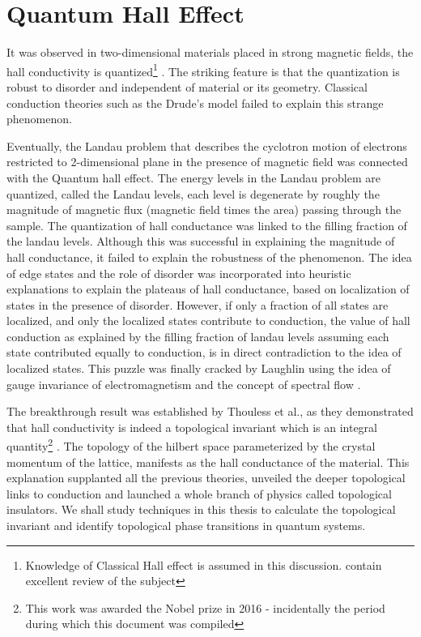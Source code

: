 %

\chapter{Quantum Hall Effect}\label{ch:qhe}
It was observed in two-dimensional materials placed in strong magnetic fields, the hall conductivity is quantized\footnote{Knowledge of Classical Hall effect is assumed in this discussion.
\parencite{kitel1971introduction,tong2016lectures,jain2007composite} contain excellent review of the subject} \cite{klitzing1980new, prange1990quantum, jain2007composite}. The striking feature is that the quantization is robust to disorder and independent of
material or its geometry. Classical conduction theories such as the Drude's model failed to explain this strange phenomenon. 

Eventually, the Landau problem that describes the cyclotron motion of electrons restricted to 2-dimensional plane in the presence of magnetic field was connected with the Quantum hall effect. 
The energy levels in the Landau problem are quantized, called the Landau levels, each level is degenerate by roughly the magnitude of magnetic flux (magnetic field times the area) passing 
through the sample. The quantization of hall conductance was linked to the filling fraction of the landau levels. Although this was successful in explaining the magnitude of hall
conductance, it failed to explain the robustness of the phenomenon. The idea of edge states and the role of disorder was incorporated into heuristic explanations to explain the plateaus of hall conductance, based on localization
of states in the presence of disorder. However, if only a fraction of all states are localized, and only the localized states contribute to conduction, the value of hall conduction as explained
by the filling fraction of landau levels assuming each state contributed equally to conduction, is in direct contradiction to the idea of localized states. This puzzle was finally cracked by 
Laughlin using the idea of gauge invariance of electromagnetism and the concept of spectral flow \cite{laughlin1981quantized, prange1981quantized, halperin1982quantized, jain2007composite, tong2016lectures}.

The breakthrough result was established by Thouless et al., as they demonstrated that hall conductivity is indeed a topological invariant which is an integral quantity\footnote{This work was awarded the Nobel prize in 2016 - incidentally the period during which this document was compiled} \cite{thouless1982quantized,kohmoto1985topological,simon1983holonomy}. The topology of the hilbert space parameterized by 
the crystal momentum of the lattice, manifests as the hall conductance of the material. This explanation supplanted all the previous theories, unveiled the deeper topological links to conduction
and launched a whole branch of physics called topological insulators. We shall study techniques in this thesis to calculate the topological invariant and identify topological phase transitions
in quantum systems.

